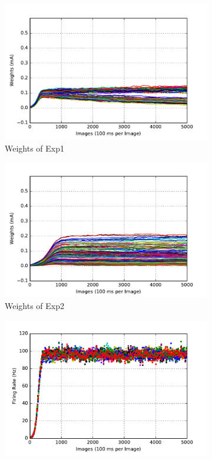 \begin{figure}
	\centering
	\begin{subfigure}[t]{0.4\textwidth}
		\includegraphics[width=\textwidth]{pics_sdlm/17_exp_SRBM_all_long/exp1_weights_s.pdf}
		\caption{Weights of Exp1}
	\end{subfigure}
	\begin{subfigure}[t]{0.4\textwidth}
		\includegraphics[width=\textwidth]{pics_sdlm/17_exp_SRBM_all_long/exp2_weights_s.pdf}
		\caption{Weights of Exp2}
	\end{subfigure}
	\begin{subfigure}[t]{0.4\textwidth}
		\includegraphics[width=\textwidth]{pics_sdlm/17_exp_SRBM_all_long/exp1_recon_s.pdf}

\end{subfigure}
\end{figure}
